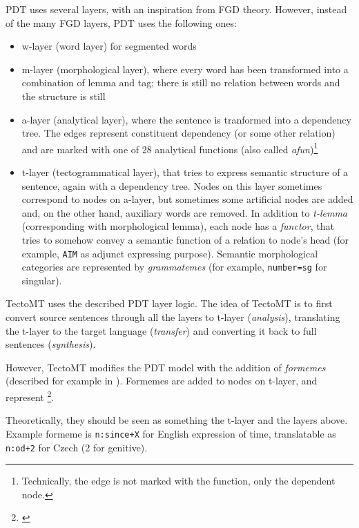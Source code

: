 PDT uses several layers, with an inspiration from FGD theory. However, instead of the many FGD layers, PDT uses the following ones:
\begin{itemize}
\item w-layer (word layer) for segmented words
\item m-layer (morphological layer), where every word has been transformed into a combination of lemma and tag; there is still no relation between words and the  structure is still 
\item a-layer (analytical layer), where the sentence is tranformed into a dependency tree. The edges represent constituent dependency (or some other relation) and are marked with one of 28 analytical functions (also called \emph{afun})\footnote{Technically, the edge is not marked with the function, only the dependent node.}
\item t-layer (tectogrammatical layer), that tries to express semantic structure of a sentence, again with a dependency tree. Nodes on this layer sometimes correspond to nodes on a-layer, but sometimes some artificial nodes are added and, on the other hand, auxiliary words are removed. In addition to \emph{t-lemma} (corresponding with morphological lemma), each node has a \emph{functor}, that tries to somehow convey a semantic function of a relation to node's head (for example, \texttt{AIM} as adjunct expressing purpose). Semantic morphological categories are represented by \emph{grammatemes} (for example, \texttt{number=sg} for singular).
\end{itemize}

TectoMT uses the described PDT layer logic. 
The idea of TectoMT is to first convert source sentences through all the layers to t-layer (\emph{analysis}), translating the t-layer to the target language (\emph{transfer}) and converting it back to full sentences (\emph{synthesis}).

However, TectoMT modifies the PDT model with the addition of \emph{formemes} (described for example in \cite{zabokrtsky_hab}). Formemes are added to nodes on t-layer, and represent \footnote{\cite{zabokrtsky_hab}}. 

Theoretically, they should be seen as something  the t-layer and the layers above.
Example formeme is \texttt{n:since+X} for English expression of time, translatable as \texttt{n:od+2} for Czech (2 for genitive).

